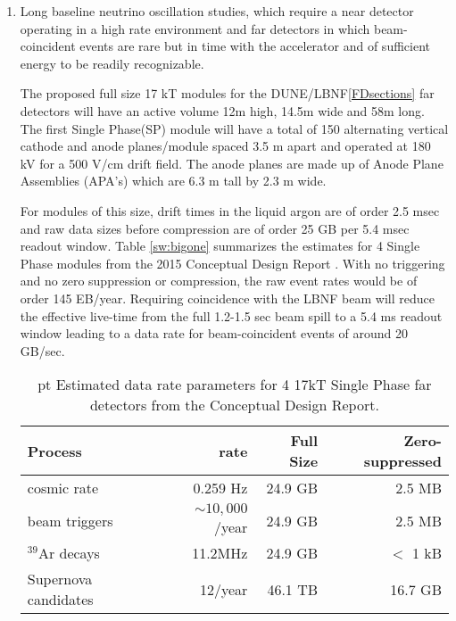 \begin{enumerate}
\item Long baseline neutrino oscillation studies, which require a near detector operating in a high rate environment and far detectors in which beam-coincident events are rare but in time with the accelerator and of sufficient energy to be readily recognizable.  

The proposed  full size 17 kT modules for the DUNE/LBNF\ref{FDsections} far detectors will  have an active volume 12m high, 14.5m wide and 58m long.  The first Single Phase(SP) module will have 
a total of 150 alternating vertical cathode and anode planes/module  spaced 3.5 m apart and operated at 180 kV for a 500 V/cm drift field.  The anode planes are made up of Anode Plane Assemblies  (APA's) which are 6.3 m tall by 2.3 m wide. %

For modules of this size, drift times in the liquid argon are of order 2.5 msec and raw data sizes before compression are of order 25 GB per 5.4 msec readout window. Table \ref{sw:bigone} summarizes the estimates for 4 Single Phase modules from the 2015 Conceptual Design Report \cite{17Krates}.  With no triggering and no zero suppression or compression, the raw event rates would be of order 145 EB/year. 
Requiring  coincidence with the LBNF beam will reduce the effective live-time from the full 1.2-1.5 sec beam spill to a 5.4 ms readout window leading to a data rate for beam-coincident events of around 20 GB/sec.

\begin{table}[htp]
\begin{center}
\begin{tabular}{|l|r|r|r|}
\hline
Process&rate&Full Size&Zero-suppressed\\
\hline
cosmic rate&0.259 Hz&24.9 GB&2.5 MB\\
beam triggers&$\sim 10,000$/year&24.9 GB&2.5 MB\\
$^{39}$Ar decays&11.2MHz&24.9 GB&$<$ 1 kB\\
Supernova candidates &12/year&46.1 TB&16.7 GB\\
\hline
\end{tabular}
\end{center}
\caption{\normalsize {} pt Estimated data rate parameters for 4 17kT Single Phase far detectors from the Conceptual Design Report. }
\label{bigone}
\end{table}%



\end{enumerate}
